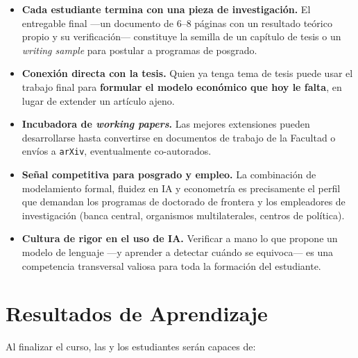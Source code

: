 \documentclass[11pt]{article}
\begin{document}
\begin{itemize}
\item \textbf{Cada estudiante termina con una pieza de investigaci\'on.} El entregable final ---un documento de 6--8 p\'aginas con un resultado te\'orico propio y su verificaci\'on--- constituye la semilla de un cap\'itulo de tesis o un \emph{writing sample} para postular a programas de posgrado.
\item \textbf{Conexi\'on directa con la tesis.} Quien ya tenga tema de tesis puede usar el trabajo final para \textbf{formular el modelo econ\'omico que hoy le falta}, en lugar de extender un art\'iculo ajeno.
\item \textbf{Incubadora de \emph{working papers}.} Las mejores extensiones pueden desarrollarse hasta convertirse en documentos de trabajo de la Facultad o env\'ios a \texttt{arXiv}, eventualmente co-autorados.
\item \textbf{Se\~nal competitiva para posgrado y empleo.} La combinaci\'on de modelamiento formal, fluidez en IA y econometr\'ia es precisamente el perfil que demandan los programas de doctorado de frontera y los empleadores de investigaci\'on (banca central, organismos multilaterales, centros de pol\'itica).
\item \textbf{Cultura de rigor en el uso de IA.} Verificar a mano lo que propone un modelo de lenguaje ---y aprender a detectar cu\'ando se equivoca--- es una competencia transversal valiosa para toda la formaci\'on del estudiante.
\end{itemize}

\section{Resultados de Aprendizaje}

Al finalizar el curso, las y los estudiantes ser\'an capaces de:
\end{document}
